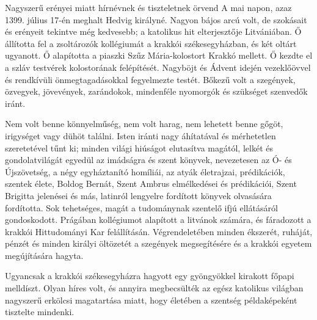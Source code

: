\documentclass[twoside]{article}
\begin{document}
\begin{lectio}{Nagyszerű erényei miatt hírnévnek és tiszteletnek örvend}
\noindent A mai napon, azaz 1399. július 17-én meghalt Hedvig királyné. Nagyon bájos arcú volt, de szokásait és erényeit tekintve még kedvesebb; a katolikus hit elterjesztője Litvániában. Ő állította fel a zsoltározók kollégiumát a krakkói székesegyházban, és két oltárt ugyanott. Ő alapította a piaszki Szűz Mária-kolostort Krakkó mellett. Ő kezdte el a szláv testvérek kolostorának felépítését. Nagyböjt és Ádvent idején vezeklőövvel és rendkívüli önmegtagadásokkal fegyelmezte testét. Bőkezű volt a szegények, özvegyek, jövevények, zarándokok, mindenféle nyomorgók és szükséget szenvedők iránt.

Nem volt benne könnyelműség, nem volt harag, nem lehetett benne gőgöt, irigységet vagy dühöt találni. Isten iránti nagy áhítatával és mérhetetlen szeretetével tűnt ki; minden világi hiúságot elutasítva magától, lelkét és gondolatvilágát egyedül az imádságra és szent könyvek, nevezetesen az Ó- és Újszövetség, a négy egyháztanító homíliái, az atyák életrajzai, prédikációk, szentek élete, Boldog Bernát, Szent Ambrus elmélkedései és prédikációi, Szent Brigitta jelenései és más, latinról lengyelre fordított könyvek olvasására fordította. Sok tehetséges, magát a tudománynak szentelő ifjú ellátásáról gondoskodott. Prágában kollégiumot alapított a litvánok számára, és fáradozott a krakkói Hittudományi Kar felállításán. Végrendeletében minden ékszerét, ruháját, pénzét és minden királyi öltözetét a szegények megsegítésére és a krakkói egyetem megújítására hagyta.

Ugyancsak a krakkói székesegyházra hagyott egy gyöngyökkel kirakott főpapi melldíszt. Olyan híres volt, és annyira megbecsülték az egész katolikus világban nagyszerű erkölcsi magatartása miatt, hogy életében a szentség példaképeként tisztelte mindenki.
\end{lectio}


\end{document}
